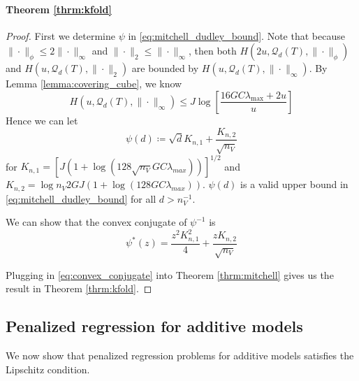 \documentclass[12pt]{article}
\begin{document}
\paragraph{Theorem \ref{thrm:kfold}}
\begin{proof}
	First we determine $\psi$ in \eqref{eq:mitchell_dudley_bound}. Note that because $\|\cdot\|_\phi \le 2\|\cdot \|_\infty $ and $\| \cdot \|_2 \le \| \cdot \|_\infty$, then both $H(2u,\mathcal{Q}_{d}(T),\|\cdot\|_{\phi})$ and $H(u,\mathcal{Q}_{d}(T),\|\cdot\|_2)$ are bounded by 
	$H(u,\mathcal{Q}_{d}(T),\|\cdot\|_{\infty})$.
	By Lemma \ref{lemma:covering_cube}, we know
	\begin{equation}
	H(u,\mathcal{Q}_{d}(T),\|\cdot\|_{\infty}) \le J \log\left [
	\frac{16GC\lambda_{\max} + 2u}{u}
	\right ]
	\end{equation}
	Hence we can let
	\begin{equation}
	\psi(d) \coloneqq
	\sqrt{d}K_{n,1}
	+
	\frac{K_{n,2}}{\sqrt{n_V}} 
	\end{equation}
	for $K_{n,1} = \left[J\left(1+\log\left(128\sqrt{n_V} GC\lambda_{max}  \right)\right)\right]^{1/2}$ and $K_{n,2} = \log n_V 2GJ\left(1+\log\left(128GC\lambda_{max}\right)\right)$. $\psi(d)$ is a valid upper bound in \eqref{eq:mitchell_dudley_bound}  for all $d > n_V^{-1}$.
	
	We can show that the convex conjugate of $\psi^{-1}$ is
	\begin{equation}
	\label{eq:convex_conjugate}
	\psi^*(z) = \frac{z^2 K_{n,1}^2}{4} + \frac{z K_{n,2}}{\sqrt{n_V}}
	\end{equation}	
	
	Plugging in \eqref{eq:convex_conjugate} into Theorem \ref{thrm:mitchell} gives us the result in Theorem \ref{thrm:kfold}.
\end{proof}

\subsection{Penalized regression for additive models}

We now show that penalized regression problems for additive models satisfies the Lipschitz condition.
\end{document}
